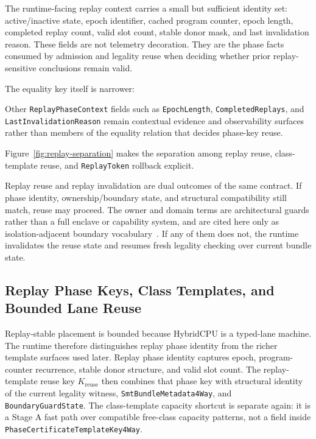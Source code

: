 \documentclass[twocolumn]{article}
\begin{document}
The runtime-facing replay context carries a small but sufficient identity set: active/inactive state, epoch identifier, cached program counter, epoch length, completed replay count, valid slot count, stable donor mask, and last invalidation reason. These fields are not telemetry decoration. They are the phase facts consumed by admission and legality reuse when deciding whether prior replay-sensitive conclusions remain valid.

The equality key itself is narrower:

Other \texttt{ReplayPhaseContext} fields such as \texttt{EpochLength}, \texttt{CompletedReplays}, and \texttt{LastInvalidationReason} remain contextual evidence and observability surfaces rather than members of the equality relation that decides phase-key reuse.

Figure~\ref{fig:replay-separation} makes the separation among replay reuse, class-template reuse, and \texttt{ReplayToken} rollback explicit.



Replay reuse and replay invalidation are dual outcomes of the same contract. If phase identity, ownership/boundary state, and structural compatibility still match, reuse may proceed. The owner and domain terms are architectural guards rather than a full enclave or capability system, and are cited here only as isolation-adjacent boundary vocabulary~\cite{woodruff2014cheri,costan2016sanctum,bourgeat2019mi6,lipp2019spectre,lee2020keystone}. If any of them does not, the runtime invalidates the reuse state and resumes fresh legality checking over current bundle state.


\subsection{Replay Phase Keys, Class Templates, and Bounded Lane Reuse}

Replay-stable placement is bounded because HybridCPU is a typed-lane machine. The runtime therefore distinguishes replay phase identity from the richer template surfaces used later. Replay phase identity captures epoch, program-counter recurrence, stable donor structure, and valid slot count. The replay-template reuse key \(K_{\mathrm{reuse}}\) then combines that phase key with structural identity of the current legality witness, \texttt{SmtBundleMetadata4Way}, and \texttt{BoundaryGuardState}. The class-template capacity shortcut is separate again: it is a Stage A fast path over compatible free-class capacity patterns, not a field inside \texttt{PhaseCertificateTemplateKey4Way}.
\end{document}
